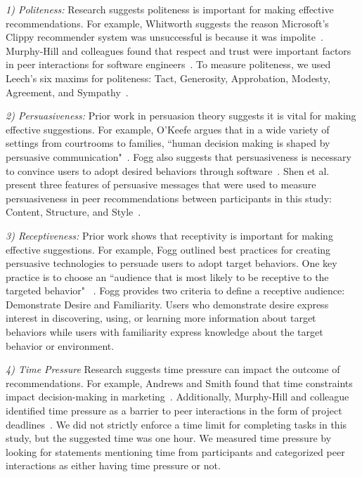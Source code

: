 \textit{1) Politeness:} Research suggests politeness is important for making effective recommendations. For example, Whitworth suggests the reason Microsoft's Clippy recommender system was unsuccessful is because it was
impolite~\cite{WhitworthPolite}. 
Murphy-Hill and colleagues found that 
respect and trust 
were important factors in 
peer interactions for software engineers~\cite{Murphy-Hill2015HowDoUsers}. 
To measure politeness,
we used Leech's six maxims for politeness: 
Tact, Generosity, Approbation, Modesty, 
Agreement, and Sympathy~\cite{LeechPragmatics}.

\textit{2) Persuasiveness:} Prior work in persuasion theory suggests it is vital for making effective suggestions. For example, O'Keefe argues that in a wide variety of settings from courtrooms to families, ``human decision making is shaped by persuasive communication"~\cite[p.~31]{okeefe2002persuasion}. Fogg also suggests that persuasiveness is necessary to convince users to adopt desired behaviors through software~\cite{Fogg2009Persuasive}. Shen et al. present three features of persuasive messages that were used to measure persuasiveness in peer recommendations between participants in this study: Content, Structure, and Style~\cite{ShenMessageFeatures}.

\textit{3) Receptiveness:} Prior work shows that receptivity is important for making effective suggestions. For example, Fogg outlined best practices for creating
persuasive technologies to persuade users to adopt target behaviors. One key practice is to choose an ``audience that is most likely to be receptive to the targeted behavior" ~\cite{Fogg2009Persuasive}. Fogg provides two criteria to define a receptive audience: Demonstrate Desire and Familiarity. Users who demonstrate desire express interest in discovering, using, or learning more information about target behaviors while users with familiarity express knowledge about the target behavior or environment.

\textit{4) Time Pressure} Research suggests time pressure can impact the outcome of recommendations. For example, 
Andrews and Smith found that time constraints impact decision-making 
in marketing~\cite{AndrewsTimePressure}. 
Additionally, Murphy-Hill and colleague identified time pressure as a barrier to peer interactions in the form of project deadlines~\cite{Murphy-Hill2015HowDoUsers}. 
We did not strictly enforce a time limit for completing tasks in this study, but the suggested time was one hour. We measured time pressure by looking for statements 
mentioning time from participants and categorized peer interactions as either having time pressure or not.

